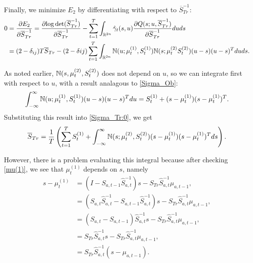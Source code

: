 \documentclass[12pt,leqno]{article}
\begin{document}
Finally, we minimize $E_2$ by differentiating with respect to $\overline{S}_{Tr}^{-1}$:
\begin{equation}\label{Sigma_Tr:0}
  \begin{split}
  0 &= \frac{\partial{E_2}}{\partial{\overline{S}_{Tr}^{-1}}} = \frac{\partial{\log\det(\overline{S}_{Tr}^{-1})}}{\partial\overline{S}_{Tr}^{-1}}
  - \sum_{t=1}^T\int_{{\mathbb R}^{2n}}\hat{\gamma}_t(s,u)\frac{\partial{Q(s;u,\overline{S}_{Tr}^{-1})}}{\partial\overline{S}_{Tr}^{-1}}duds \\
      &= (2-\delta_{ij})T\overline{S}_{Tr} - (2-\delta{ij}) \sum_{t=1}^T\int_{{\mathbb R}^{2n}}{\mathbb N}(u;\mu^{(1)}_t,S^{(1)}_t){\mathbb N}(s;\mu^{(2)}_tS^{(2)}_t)(u-s)(u-s)^Tduds.
  \end{split}
\end{equation}

As noted earlier, ${\mathbb N}(s,\mu^{(2)}_t,S^{(2)}_t)$ does not depend on $u$, so we can integrate first with respect to $u$, with a result
analagous to \eqref{Sigma_Ob}:
$$
  \int_{-\infty}^{\infty}{\mathbb N}(u;\mu^{(1)}_t,S^{(1)}_t)(u-s)(u-s)^Tdu = S^{(1)}_t + (s-\mu^{(1)}_t)(s-\mu^{(1)}_t)^T.
$$
Substituting this result into \eqref{Sigma_Tr:0}, we get
\begin{equation}\label{Sigma_Tr:1}
  \overline{S}_{Tr} =  \frac{1}{T}\left(\sum_{t=1}^TS^{(1)}_t +\int_{-\infty}^{\infty}{\mathbb N}(s;\mu^{(2)}_t,S^{(2)}_t)
  (s-\mu^{(1)}_t)(s-\mu^{(1)}_t)^Tds\right).
\end{equation}

However, there is a problem evaluating this integral because after checking \eqref{mu(1)}, we see that $\mu^{(1)}_t$
depends on $s$, namely  
\begin{equation}\label{s-mu_1}
    \begin{split}
s - \mu^{(1)}_t &= (I - S_{a,t-1}\widehat{S}_{a,t}^{-1})s - S_{Tr}\widehat{S}_{a,t}^{-1}\mu_{a,t-1}, \\
  &= (\widehat{S}_{a,t}\widehat{S}_{a,t}^{-1} - S_{a,t-1}\widehat{S}_{a,t}^{-1})s  - 
  S_{Tr}\widehat{S}_{a,t}^{-1}\mu_{a,t-1},\\
  &= (\widehat{S}_{a,t} - S_{a,t-1})\widehat{S}_{a,t}^{-1}s - S_{Tr}\widehat{S}_{a,t}^{-1}\mu_{a,t-1},\\
  &= S_{Tr}\widehat{S}_{a,t}^{-1}s - S_{Tr}\widehat{S}_{a,t}^{-1}\mu_{a,t-1},\\
  &= S_{Tr}\widehat{S}_{a,t}^{-1}(s - \mu_{a,t-1}).
    \end{split}
\end{equation}
\end{document}
